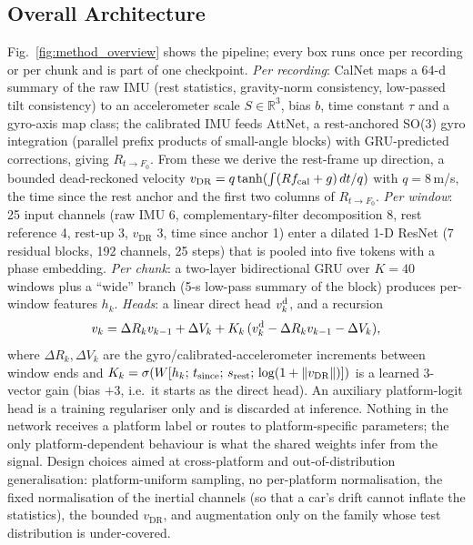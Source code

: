 \documentclass[letterpaper,10pt,conference]{ieeeconf}
\newcommand{\vdr}{v_{\mathrm{DR}}}
\begin{document}
\subsection{Overall Architecture}
Fig.~\ref{fig:method_overview} shows the pipeline; every box runs once per recording or per chunk
and is part of one checkpoint. \emph{Per recording}: CalNet maps a 64-d summary of the raw IMU
(rest statistics, gravity-norm consistency, low-passed tilt consistency) to an accelerometer scale
$S\in\mathbb{R}^3$, bias $b$, time constant $\tau$ and a gyro-axis map class; the calibrated IMU
feeds AttNet, a rest-anchored SO(3) gyro integration (parallel prefix products of small-angle
blocks) with GRU-predicted corrections, giving $R_{t\to F_0}$. From these we derive the rest-frame
up direction, a bounded dead-reckoned velocity $\vdr = q\tanh(\int (R f_{\rm cal}+g)\,dt/q)$ with
$q=8$\,m/s, the time since the rest anchor and the first two columns of $R_{t\to F_0}$.
\emph{Per window}: 25 input channels (raw IMU 6, complementary-filter decomposition 8, rest
reference 4, rest-up 3, $\vdr$ 3, time since anchor 1) enter a dilated 1-D ResNet (7 residual
blocks, 192 channels, 25 steps) that is pooled into five tokens with a phase embedding.
\emph{Per chunk}: a two-layer bidirectional GRU over $K=40$ windows plus a ``wide'' branch (5-s
low-pass summary of the block) produces per-window features $h_k$. \emph{Heads}: a linear direct
head $v^{\rm d}_k$, and a recursion
\begin{equation}
v_k = \Delta R_k v_{k-1} + \Delta V_k + K_k\,(v^{\rm d}_k - \Delta R_k v_{k-1} - \Delta V_k),
\label{eq:ekf}
\end{equation}
where $\Delta R_k,\Delta V_k$ are the gyro/calibrated-accelerometer increments between window
ends and $K_k=\sigma(W[h_k;\,t_{\rm since};\,s_{\rm rest};\,\log(1+\|\vdr\|)])$ is a learned
3-vector gain (bias $+3$, i.e.\ it starts as the direct head). An auxiliary platform-logit head is a
training regulariser only and is discarded at inference. Nothing in the network receives a platform
label or routes to platform-specific parameters; the only platform-dependent behaviour is what the
shared weights infer from the signal. Design choices aimed at cross-platform and
out-of-distribution generalisation: platform-uniform sampling, no per-platform normalisation, the
fixed normalisation of the inertial channels (so that a car's drift cannot inflate the statistics),
the bounded $\vdr$, and augmentation only on the family whose test distribution is under-covered.
\end{document}
